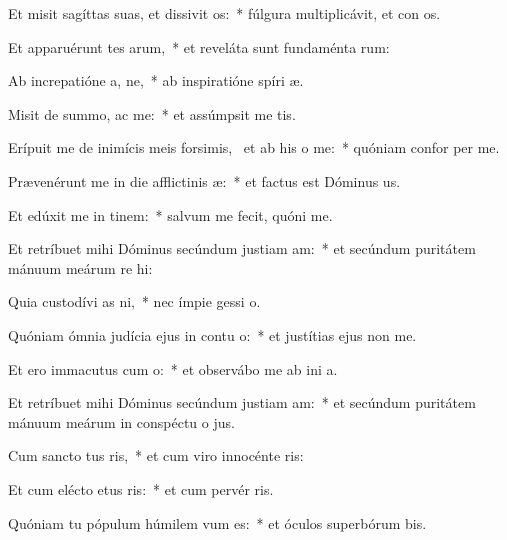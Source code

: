 \item Et misit sagíttas suas, et dissivit os:~* fúlgura multiplicávit, et con os.
\item Et apparuérunt tes arum,~* et reveláta sunt fundaménta  rum:
\item Ab increpatióne a, ne,~* ab inspiratióne spíri  æ.
\item Misit de summo,  ac me:~* et assúmpsit me   tis.
\item Erípuit me de inimícis meis forsimis,~\pscross{} et ab his  o me:~* quóniam confor  per me.
\item Prævenérunt me in die afflictinis æ:~* et factus est Dóminus  us.
\item Et edúxit me in tinem:~* salvum me fecit, quóni  me.
\item Et retríbuet mihi Dóminus secúndum justiam am:~* et secúndum puritátem mánuum meárum re hi:
\item Quia custodívi as ni,~* nec ímpie gessi   o.
\item Quóniam ómnia judícia ejus in contu o:~* et justítias ejus non   me.
\item Et ero immacutus cum o:~* et observábo me ab ini a.
\item Et retríbuet mihi Dóminus secúndum justiam am:~* et secúndum puritátem mánuum meárum in conspéctu o jus.
\item Cum sancto tus ris,~* et cum viro innocénte  ris:
\item Et cum elécto etus ris:~* et cum pervér ris.
\item Quóniam tu pópulum húmilem vum es:~* et óculos superbórum bis.
